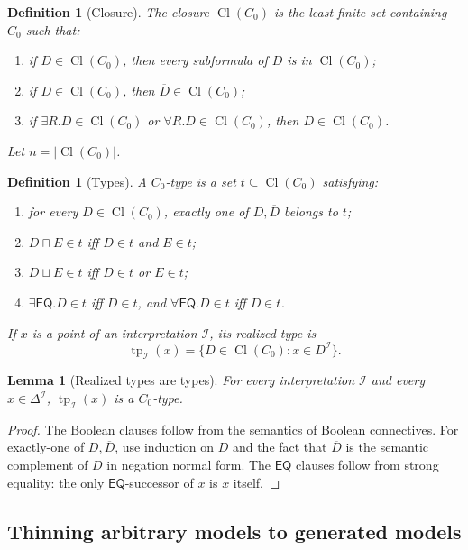 \documentclass[11pt]{article}
\newtheorem{lemma}[theorem]{Lemma}
\newtheorem{definition}[theorem]{Definition}
\newcommand{\EQ}{\mathsf{EQ}}
\newcommand{\Cl}{\operatorname{Cl}}
\newcommand{\I}{\mathcal I}
\newcommand{\typ}{\operatorname{tp}}
\begin{document}
\begin{definition}[Closure]\label{def:closure}
The closure $\Cl(C_0)$ is the least finite set containing $C_0$ such that:
\begin{enumerate}[label=(C\arabic*)]
\item if $D\in\Cl(C_0)$, then every subformula of $D$ is in $\Cl(C_0)$;
\item if $D\in\Cl(C_0)$, then $\overline D\in\Cl(C_0)$;
\item if $\exists R.D\in\Cl(C_0)$ or $\forall R.D\in\Cl(C_0)$, then $D\in\Cl(C_0)$.
\end{enumerate}
Let $n=|\Cl(C_0)|$.
\end{definition}

\begin{definition}[Types]\label{def:types}
A $C_0$-type is a set $t\subseteq\Cl(C_0)$ satisfying:
\begin{enumerate}[label=(T\arabic*)]
\item for every $D\in\Cl(C_0)$, exactly one of $D,\overline D$ belongs to $t$;
\item $D\sqcap E\in t$ iff $D\in t$ and $E\in t$;
\item $D\sqcup E\in t$ iff $D\in t$ or $E\in t$;
\item $\exists\EQ.D\in t$ iff $D\in t$, and $\forall\EQ.D\in t$ iff $D\in t$.
\end{enumerate}
If $x$ is a point of an interpretation $\I$, its realized type is
\[
   \typ_\I(x)=\{D\in\Cl(C_0):x\in D^\I\}.
\]
\end{definition}

\begin{lemma}[Realized types are types]\label{lem:realized-type}
For every interpretation $\I$ and every $x\in\Delta^\I$, $\typ_\I(x)$ is a $C_0$-type.
\end{lemma}

\begin{proof}
The Boolean clauses follow from the semantics of Boolean connectives.  For exactly-one of $D,\overline D$, use induction on $D$ and the fact that $\overline D$ is the semantic complement of $D$ in negation normal form.  The $\EQ$ clauses follow from strong equality: the only $\EQ$-successor of $x$ is $x$ itself.
\end{proof}

\subsection{Thinning arbitrary models to generated models}
\end{document}
